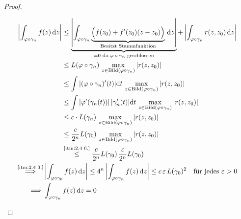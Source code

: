 \begin{theorem}
\begin{proof}
\begin{enum-arab}
      \item 
      \begin{gather*}
        \begin{aligned}
          \left| \int_{\varphi \circ \gamma_n} f(z) \, \mathrm{d}z \right|
          &\leq \underbrace{\left| \int_{\varphi \circ \gamma_n} \underbrace{\Big(f(z_0) + f'(z_0) (z-z_0)\Big)}_{\text{Besitzt Stammfunktion}} \, \mathrm{d}z \right|}_{=0 \text{ da $\varphi \circ \gamma_n$ geschlossen}}
          + \left| \int_{\varphi \circ \gamma_n} r(z,z_0) \, \mathrm{d}z \right| \\
          &\leq L(\varphi \circ \gamma_n)
          \, \max\limits_{z \in \mathrm{Bild}(\varphi \circ \gamma_n)} |r(z,z_0)| \\
          &\leq \int |(\varphi \circ \gamma_n)'(t)| \mathrm{d}t
          \, \max\limits_{z \in \mathrm{Bild}(\varphi \circ \gamma_n)} |r(z,z_0)| \\
          &\leq \int |\varphi'(\gamma_n(t))| \, |\gamma_n'(t)| \mathrm{d}t
          \, \max\limits_{z \in \mathrm{Bild}(\varphi \circ \gamma_n)} |r(z,z_0)| \\
          &\leq c \cdot L(\gamma_n)
          \, \max\limits_{z \in \mathrm{Bild}(\varphi \circ \gamma_n)} |r(z,z_0)| \\
          &\leq \frac{c}{2^n} L(\gamma_0)
          \, \max\limits_{z \in \mathrm{Bild}(\varphi \circ \gamma_n)} |r(z,z_0)| \\
          &\overset{\text{\ref{itm:2.4 6.}}}{\leq} \frac{c}{2^n} L(\gamma_0) \, \frac{\varepsilon}{2^n} L(\gamma_0) \\
        \end{aligned} \\
        \begin{aligned}
          \overset{\text{\ref{itm:2.4 3.}}}{\implies}& \left| \int_{\varphi \circ \gamma_0} f(z) \, \mathrm{d}z \right|
          \leq 4^n \left| \int_{\varphi \circ \gamma_n} f(z) \, \mathrm{d}z \right| \leq c \, \varepsilon \, L(\gamma_0)^2 \quad \text{für jedes } \varepsilon > 0 \\
          \implies& \int_{\varphi \circ \gamma_n} f(z) \, \mathrm{d}z = 0
        \end{aligned}
      \end{gather*}
    \end{enum-arab}
  \end{proof}
\end{theorem}

